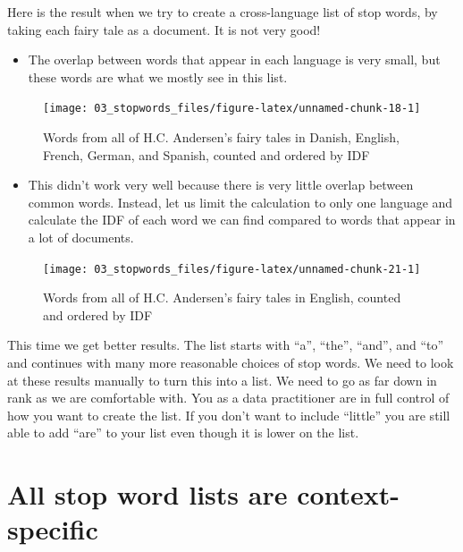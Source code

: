 \documentclass[
]{krantz}
\newenvironment{rmdblock}[1]
  {\begin{shaded*}
  \begin{itemize}[left = -1cm, labelsep = 1cm]
  \renewcommand{\labelitemi}{
    \raisebox{-.7\height}[0pt][0pt]{
      {\setkeys{Gin}{width=3em,keepaspectratio}\texttt{[image: images/\#1]}}
    }
  }
 
  \item
  }
  {
  \end{itemize}
  \end{shaded*}
  }
\newenvironment{rmdnote}
  {\begin{rmdblock}{note}}
  {\end{rmdblock}}
\newenvironment{rmdwarning}
  {\begin{rmdblock}{warning}}
  {\end{rmdblock}}
\begin{document}
Here is the result when we try to create a cross-language list of stop words, by taking each fairy tale as a document. It is not very good!

\begin{rmdnote}
The overlap between words that appear in each language is very small,
but these words are what we mostly see in this list.
\end{rmdnote}

\begin{figure}

{\centering \texttt{[image: 03\_stopwords\_files/figure-latex/unnamed-chunk-18-1]} 

}

\caption{Words from all of H.C. Andersen's fairy tales in Danish, English, French, German, and Spanish, counted and ordered by IDF}\label{fig:unnamed-chunk-18}
\end{figure}

\begin{rmdwarning}
This didn't work very well because there is very little overlap between
common words. Instead, let us limit the calculation to only one language
and calculate the IDF of each word we can find compared to words that
appear in a lot of documents.
\end{rmdwarning}


\begin{figure}

{\centering \texttt{[image: 03\_stopwords\_files/figure-latex/unnamed-chunk-21-1]} 

}

\caption{Words from all of H.C. Andersen's fairy tales in English, counted and ordered by IDF}\label{fig:unnamed-chunk-21}
\end{figure}

This time we get better results. The list starts with ``a'', ``the'', ``and'', and ``to'' and continues with many more reasonable choices of stop words. We need to look at these results manually to turn this into a list. We need to go as far down in rank as we are comfortable with. You as a data practitioner are in full control of how you want to create the list. If you don't want to include ``little'' you are still able to add ``are'' to your list even though it is lower on the list.

\hypertarget{all-stop-word-lists-are-context-specific}{%
\section{All stop word lists are context-specific}\label{all-stop-word-lists-are-context-specific}}
\end{document}

